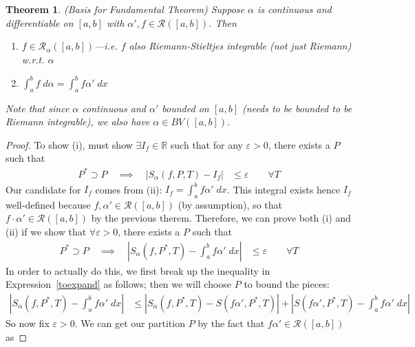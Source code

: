 \documentclass[12pt]{book}
\numberwithin{equation}{section} %
\theoremstyle{plain}
\newtheorem{thm}{Theorem}[section]
\theoremstyle{definition}
\theoremstyle{remark}
\newcommand{\sR}{\mathscr{R}}
\newcommand{\R}{\mathbb{R}}
\begin{document}
\begin{thm}\emph{(Basis for Fundamental Theorem)}
\label{ftcbasis}
Suppose $\alpha$ is continuous and differentiable on $[a,b]$ with
$\alpha', f\in\mathscr{R}([a,b])$. Then
\begin{enumerate}[label=\emph{(\roman*)}]
  \item $f\in\mathscr{R}_\alpha([a,b])$---i.e. $f$ also
    Riemann-\emph{Stieltjes} integrable (not just Riemann) w.r.t.
    $\alpha$
  \item $\int^b_a f\;d\alpha = \int^b_a f \alpha'\;dx$
\end{enumerate}
Note that since $\alpha$ continuous and $\alpha'$ bounded on $[a,b]$
(needs to be bounded to be Riemann integrable), we also have
$\alpha \in BV([a,b])$.
\end{thm}
\begin{proof}
To show (i), must show $\exists I_f\in\R$ such that for any
$\varepsilon>0$, there exists a $P$ such that
\begin{align*}
  P^*\supset P
  \quad\implies\quad
  \left\lvert  S_\alpha(f,P,T) - I_f \right\rvert &\leq \varepsilon
  \qquad \forall T
\end{align*}
Our candidate for $I_f$ comes from (ii): $I_f=\int^b_a f\alpha'\; dx$.
This integral exists hence $I_f$ well-defined because $f,\alpha'
\in\mathscr{R}([a,b])$ (by assumption), so that $f\cdot
\alpha'\in\sR([a,b])$ by the previous therem.
Therefore, we can prove both (i) and (ii) if we show that
$\forall\varepsilon>0$, there exists a $P$ such that
\begin{align}
  P^*\supset P
  \quad\implies\quad
  \left\lvert
  S_\alpha(f,P^*,T) - \int^b_a f\alpha'\;dx
  \right\rvert &\leq \varepsilon
  \qquad \forall T
  \label{toexpand}
\end{align}
In order to actually do this, we first break up the inequality in
Expression~\ref{toexpand} as follows; then we will choose $P$ to bound
the pieces:
\begin{align}
  \left\lvert
  S_\alpha(f,P^*,T) - \int^b_a f\alpha'\;dx
  \right\rvert
  &\leq
  \left\lvert
  S_\alpha(f,P^*,T) - S(f\alpha',P^*,T)
  \right\rvert
  +
  \left\lvert
  S(f\alpha',P^*,T)
  - \int^b_a f\alpha'\;dx
  \right\rvert
  \label{fundbasistobound}
\end{align}
So now fix $\varepsilon>0$.
We can get our partition $P$ by the fact that $f\alpha'\in\sR([a,b])$ as

\end{proof}
\end{document}

